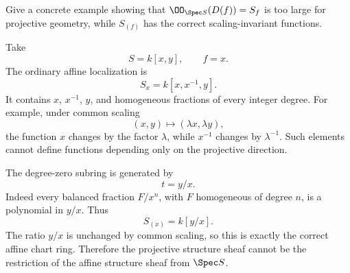 \begin{problem}\label{prob:vi35-11}
Give a concrete example showing that \(\OO_{\Spec S}(D(f))=S_f\) is too large for projective geometry, while \(S_{(f)}\) has the correct scaling-invariant functions.
\end{problem}

\ifdefined\FullProblemDossiers
\begin{solution}
Take
\[
S=k[x,y],
\qquad f=x.
\]
The ordinary affine localization is
\[
S_x=k[x,x^{-1},y].
\]
It contains \(x\), \(x^{-1}\), \(y\), and homogeneous fractions of every integer degree. For example, under common
scaling
\[
(x,y)\mapsto(\lambda x,\lambda y),
\]
the function \(x\) changes by the factor \(\lambda\), while \(x^{-1}\) changes by \(\lambda^{-1}\). Such elements
cannot define functions depending only on the projective direction.

The degree-zero subring is generated by
\[
t=y/x.
\]
Indeed every balanced fraction \(F/x^n\), with \(F\) homogeneous of degree \(n\), is a polynomial in \(y/x\).
Thus
\[
\boxed{S_{(x)}=k[y/x]}.
\]
The ratio \(y/x\) is unchanged by common scaling, so this is exactly the correct affine chart ring. Therefore the
projective structure sheaf cannot be the restriction of the affine structure sheaf from \(\Spec S\).
\end{solution}
\fi
